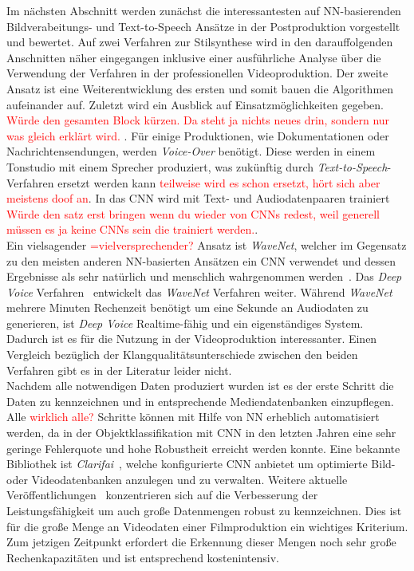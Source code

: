 \documentclass[times, 11pt,twocolumn]{article}
\begin{document}
Im nächsten Abschnitt werden zunächst die interessantesten auf NN-basierenden Bildverabeitungs- und Text-to-Speech Ansätze in der Postproduktion vorgestellt und bewertet. Auf zwei Verfahren zur Stilsynthese wird in den darauffolgenden Anschnitten näher eingegangen inklusive einer ausführliche Analyse über die Verwendung der Verfahren in der professionellen Videoproduktion. Der zweite Ansatz ist eine Weiterentwicklung des ersten und somit bauen die Algorithmen aufeinander auf. Zuletzt wird ein Ausblick auf Einsatzmöglichkeiten gegeben. \textcolor{red}{Würde den gesamten Block kürzen. Da steht ja nichts neues drin, sondern nur was gleich erklärt wird.}
.
 \label{sec:SOTAPostproduktion}
Für einige Produktionen, wie Dokumentationen oder Nachrichtensendungen, werden \textit{Voice-Over} benötigt. Diese werden in einem Tonstudio mit einem Sprecher produziert, was zukünftig durch \textit{Text-to-Speech}- Verfahren ersetzt werden kann \textcolor{red}{teilweise wird es schon ersetzt, hört sich aber meistens doof an}. In das CNN wird mit Text- und Audiodatenpaaren trainiert \textcolor{red}{Würde den satz erst bringen wenn du wieder von CNNs redest, weil generell müssen es ja keine CNNs sein die trainiert werden.}.\\
Ein vielsagender \textcolor{red}{=vielversprechender?} Ansatz ist \textit{WaveNet}, welcher im Gegensatz zu den meisten anderen NN-basierten Ansätzen ein CNN verwendet und dessen Ergebnisse als sehr natürlich und menschlich wahrgenommen werden~\cite{OordDZSVGKSK16}. Das \textit{Deep Voice} Verfahren~\cite{DeepVoice} entwickelt das \textit{WaveNet} Verfahren weiter. Während \textit{WaveNet} mehrere Minuten Rechenzeit benötigt um eine Sekunde an Audiodaten zu generieren, ist \textit{Deep Voice} Realtime-fähig und ein eigenständiges System. Dadurch ist es für die Nutzung in der Videoproduktion interessanter. Einen Vergleich bezüglich der Klangqualitätsunterschiede zwischen den beiden Verfahren gibt es in der Literatur leider nicht.
\\

Nachdem alle notwendigen Daten produziert wurden ist es der erste Schritt die Daten zu kennzeichnen und in entsprechende Mediendatenbanken einzupflegen. Alle \textcolor{red}{wirklich alle?} Schritte können mit Hilfe von NN erheblich automatisiert werden, da in der Objektklassifikation mit CNN in den letzten Jahren eine sehr geringe Fehlerquote und hohe Robustheit erreicht werden konnte. Eine bekannte Bibliothek ist \textit{Clarifai}~\cite{MITReview}, welche konfigurierte CNN anbietet um optimierte Bild- oder Videodatenbanken anzulegen und zu verwalten. Weitere aktuelle Veröffentlichungen~\cite{Ng_VideoLabelling}\cite{Ye:VideoLabelling}\cite{KangEABZ17} konzentrieren sich auf die Verbesserung der Leistungsfähigkeit um auch große Datenmengen robust zu kennzeichnen. Dies ist für die große Menge an Videodaten einer Filmproduktion ein wichtiges Kriterium. Zum jetzigen Zeitpunkt erfordert die Erkennung dieser Mengen noch sehr große Rechenkapazitäten und ist entsprechend kostenintensiv. \\
\end{document}
